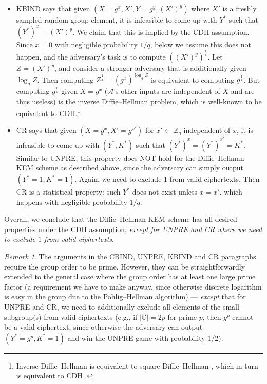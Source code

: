 \documentclass{article}
\theoremstyle{plain}
\theoremstyle{definition}
\theoremstyle{remark}
\newtheorem{remark}{Remark}
\newcommand{\group}{\mathbb{G}}
\newcommand{\adv}{\mathcal{A}}
\begin{document}
\begin{itemize}
  \item KBIND says that given $(X = g^x, X', Y = g^y, (X')^y)$ where $X'$ is a freshly sampled random group element, it is infeasible to come up with $Y^*$ such that $(Y^*)^x = (X')^y$. We claim that this is implied by the CDH assumption. Since $x = 0$ with negligible probability $1/q$, below we assume this does not happen, and the adversary's task is to compute $((X')^y)^\frac{1}{x}$. Let $Z = (X')^y$, and consider a stronger adversary that is additionally given $\log_g Z$. Then computing $Z^\frac{1}{x} = (g^\frac{1}{x})^{\log_g Z}$ is equivalent to computing $g^\frac{1}{x}$. But computing $g^\frac{1}{x}$ given $X = g^x$ ($\adv$'s other inputs are independent of $X$ and are thus useless) is the inverse Diffie--Hellman problem, which is well-known to be equivalent to CDH.\footnote{Inverse Diffie--Hellman is equivalent to square Diffie--Hellman \cite[Section~2.2]{ICICS:BaoDenZhu03}, which in turn is equivalent to CDH \cite[Section~2.1]{ICICS:BaoDenZhu03}.}
  \item CR says that given $(X = g^x, X' = g^{x'})$ for $x' \gets \mathbb{Z}_q$ independent of $x$, it is infeasible to come up with $(Y^*,K^*)$ such that $(Y^*)^x = (Y^*)^{x'} = K^*$. Similar to UNPRE, this property does NOT hold for the Diffie--Hellman KEM scheme as described above, since the adversary can simply output $(Y^* = 1, K^* = 1)$. Again, we need to exclude 1 from valid ciphertexts. Then CR is a statistical property: such $Y^*$ does not exist unless $x = x'$, which happens with negligible probability $1/q$.
\end{itemize}

Overall, we conclude that the Diffie--Hellman KEM scheme has all desired properties under the CDH assumption, \emph{except for UNPRE and CR where we need to exclude $1$ from valid ciphertexts}.
\begin{remark}
The arguments in the CBIND, UNPRE, KBIND and CR paragraphs require the group order to be prime. However, they can be straightforwardly extended to the general case where the group order has at least one large prime factor (a requirement we have to make anyway, since otherwise discrete logarithm is easy in the group due to the Pohlig--Hellman algorithm) --- \emph{except} that for UNPRE and CR, we need to additionally exclude all elements of the small subgroup(s) from valid ciphertexts (e.g., if $|\group| = 2p$ for prime $p$, then $g^p$ cannot be a valid ciphertext, since otherwise the adversary can output $(Y^* = g^p, K^* = 1)$ and win the UNPRE game with probability 1/2).
\end{remark}
\end{document}
